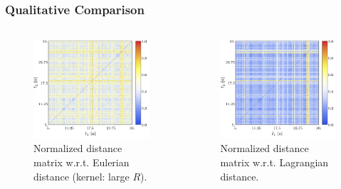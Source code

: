 \documentclass[9pt, english]{beamer}
\begin{document}
\begin{frame}[fragile]
\frametitle{Qualitative Comparison}
\begin{columns}[t]
\begin{column}{0.56\textwidth}
\begin{figure}
\centering
\includegraphics[width=1\textwidth]{field_distance_matrix_5_30_8_8_8.jpg}
\caption{Normalized distance matrix w.r.t. Eulerian distance (kernel: large \(R\)).}
\end{figure}
\end{column}
\begin{column}{0.56\textwidth}
\begin{figure}
\centering
\includegraphics[width=1\textwidth]{discrete_distance_matrix_5_30_6000_6000.jpg}
\caption{Normalized distance matrix w.r.t. Lagrangian distance.}
\end{figure}
\end{column}
\end{columns}
\end{frame}
\end{document}
